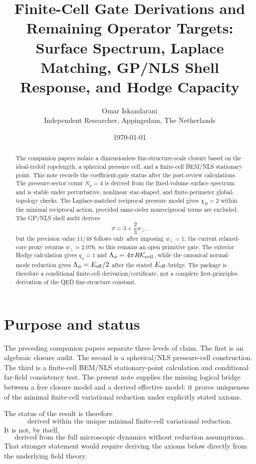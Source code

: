 \documentclass[11pt]{article}
\title{Finite-Cell Gate Derivations and Remaining Operator Targets:\\
Surface Spectrum, Laplace Matching, GP/NLS Shell Response, and Hodge Capacity}
\author{Omar Iskandarani\\
Independent Researcher, Appingedam, The Netherlands}
\date{\today}
\begin{document}
\maketitle

\begin{abstract}
The companion papers isolate a dimensionless fine-structure-scale closure based
on the ideal-trefoil ropelength, a spherical pressure cell, and a finite-cell
BEM/NLS stationary point.  This note records the coefficient-gate status after
the post-review calculations.  The pressure-sector count \(N_p=4\) is derived
from the fixed-volume surface spectrum and is stable under perturbative,
nonlinear star-shaped, and finite-perimeter global-topology checks.  The
Laplace-matched reciprocal pressure model gives \(\chi_R=2\) within the minimal
reciprocal action, provided same-order nonreciprocal terms are excluded.  The
GP/NLS shell audit derives
\[
  \sigma=3+\frac23 w_\perp,
\]
but the precision value \(11/48\) follows only after imposing \(w_\perp=1\);
the current relaxed-core proxy returns \(w_\perp\simeq2.076\), so this remains
an open primitive gate.  The exterior Hodge calculation gives \(q_\phi=1\) and
\(\Lambda_\phi=4\pi R\mathcal K_{\rm cell}\), while the canonical normal-mode
reduction gives \(\Lambda_\phi=E_{\rm eff}/2\) after the stated
\(E_{\rm eff}\)-bridge.  The package is therefore a conditional finite-cell
derivation/certificate, not a complete first-principles derivation of the QED
fine-structure constant.
\end{abstract}

\section{Purpose and status}

The preceding companion papers separate three levels of claim.  The first is
an algebraic closure audit.  The second is a spherical/NLS pressure-cell
construction.  The third is a finite-cell BEM/NLS stationary-point calculation
and conditional far-field consistency test.  The present note supplies the
missing logical bridge between a free closure model and a derived effective
model: it proves uniqueness of the minimal finite-cell variational reduction
under explicitly stated axioms.

The status of the result is therefore
\[
  \boxed{\text{derived within the unique minimal finite-cell variational reduction}.}
\]
It is not, by itself,
\[
  \boxed{\text{derived from the full microscopic dynamics without reduction assumptions}.}
\]
That stronger statement would require deriving the axioms below directly from
the underlying field theory.
\end{document}
